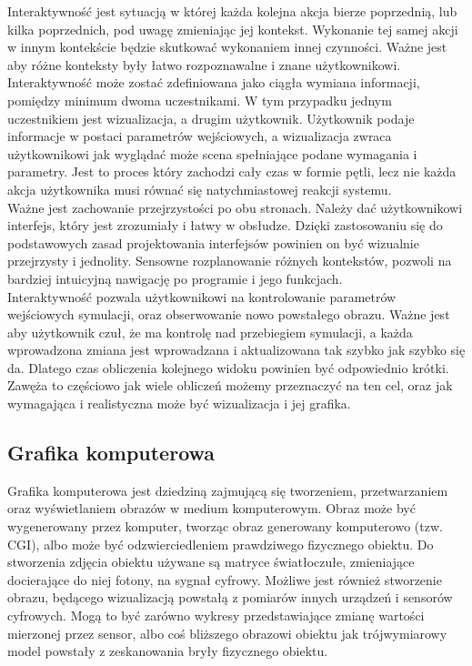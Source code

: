 \documentclass{article} %
\begin{document}
        Interaktywność jest sytuacją w której każda kolejna akcja bierze poprzednią, lub kilka poprzednich, pod uwagę zmieniając jej kontekst. Wykonanie tej samej akcji w innym kontekście będzie skutkować wykonaniem innej czynności. Ważne jest aby różne konteksty były łatwo rozpoznawalne i znane użytkownikowi.
        \\
    
        Interaktywność może zostać zdefiniowana jako ciągła wymiana informacji, pomiędzy minimum dwoma uczestnikami.  W tym przypadku jednym uczestnikiem jest wizualizacja, a drugim użytkownik. Użytkownik podaje informacje w postaci parametrów wejściowych, a wizualizacja zwraca użytkownikowi jak wyglądać może scena spełniające podane wymagania i parametry. Jest to proces który zachodzi cały czas w formie pętli, lecz nie każda akcja użytkownika musi równać się natychmiastowej reakcji systemu. \cite{interactivity}
        \\
        
        Ważne jest zachowanie przejrzystości po obu stronach. Należy dać użytkownikowi interfejs, który jest zrozumiały i łatwy w obsłudze. Dzięki zastosowaniu się do podstawowych zasad projektowania interfejsów powinien on być wizualnie przejrzysty i jednolity. Sensowne rozplanowanie różnych kontekstów, pozwoli na bardziej intuicyjną nawigację po programie i jego funkcjach.
        \cite{interacting}
        \\
    
        Interaktywność pozwala użytkownikowi na kontrolowanie parametrów wejściowych symulacji, oraz obserwowanie nowo powstałego obrazu. \cite{medicine} Ważne jest aby użytkownik czuł, że ma kontrolę nad przebiegiem symulacji, a każda wprowadzona zmiana jest wprowadzana i aktualizowana tak szybko jak szybko się da. Dlatego czas obliczenia kolejnego widoku powinien być odpowiednio krótki. Zawęża to częściowo jak wiele obliczeń możemy przeznaczyć na ten cel, oraz jak wymagająca i realistyczna może być wizualizacja i jej grafika.
        \\
                
    \subsection{Grafika komputerowa}
        Grafika komputerowa jest dziedziną zajmującą się tworzeniem, przetwarzaniem oraz wyświetlaniem obrazów w medium komputerowym. Obraz może być wygenerowany przez komputer, tworząc obraz generowany komputerowo (tzw. CGI), albo może być odzwierciedleniem prawdziwego fizycznego obiektu. Do stworzenia zdjęcia obiektu używane są matryce światłoczułe, zmieniające docierające do niej fotony, na sygnał cyfrowy. Możliwe jest również stworzenie obrazu, będącego wizualizacją powstałą z pomiarów innych urządzeń i sensorów cyfrowych. Mogą to być zarówno wykresy przedstawiające zmianę wartości mierzonej przez sensor, albo coś bliższego obrazowi obiektu jak trójwymiarowy model powstały z zeskanowania bryły fizycznego obiektu.
        \\
        
\end{document}
